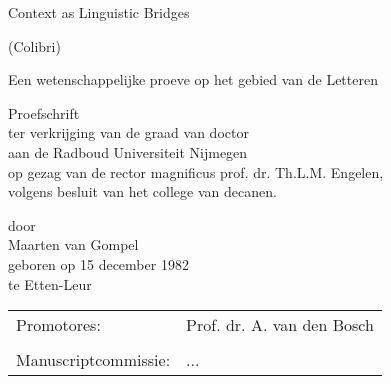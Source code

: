 \documentclass[11pt,makeidx,english]{style/phdthesis}
\author{Maarten van Gompel}
\theoremstyle{break}
\begin{document}
\frontmatter

\pagestyle{plain}



\begin{titlepage}
\begin{center}
\vspace{8cm}
{\Huge Context as Linguistic Bridges}

\vspace{0.5cm}

{\LARGE (Colibri)}

\vspace{1cm}
Een wetenschappelijke proeve op het gebied van de Letteren

\vspace{6cm}
{\LARGE Proefschrift }\\
\vspace{1cm}
ter verkrijging van de graad van doctor\\
aan de Radboud Universiteit Nijmegen\\
op gezag van de rector magnificus prof. dr. Th.L.M. Engelen,\\
volgens besluit van het college van decanen.\\

\vspace{2cm}

door\\
\vspace{1cm}
{\LARGE Maarten van Gompel}\\
\vspace{0.5cm}
geboren op 15 december 1982\\
te Etten-Leur


\vspace{0.5cm}


\end{center}

\clearpage

\thispagestyle{empty}
\begin{tabular}{ll}
Promotores: & Prof. dr. A. van den Bosch \\
 & \\
Manuscriptcommissie: & ... \\
\end{tabular}
\end{titlepage}


\tableofcontents


%

\mainmatter
\pagestyle{headings}













\end{document}
